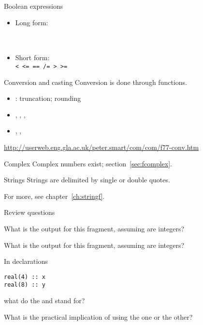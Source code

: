 \begin{block}{Boolean expressions}
  \label{sl:fbool}
  \begin{itemize}
  \item 
    Long form:\\
    \\
    \\
  \item Short form:\\
    \verb+< <= == /= > >=+
  \end{itemize}
\end{block}

\begin{block}{Conversion and casting}
  Conversion is done through functions.
  \begin{itemize}
  \item {}: truncation;  rounding
  \item {}, , , 
  \item {}, , 
  \end{itemize}
\url{http://userweb.eng.gla.ac.uk/peter.smart/com/com/f77-conv.htm}
\end{block}

\begin{block}{Complex}
  Complex numbers exist; section~\ref{sec:fcomplex}.
\end{block}

\begin{block}{Strings}
  Strings are delimited by single or double quotes.

  For more, see chapter~\ref{ch:stringf}.
\end{block}

 {Review questions}

\begin{exercise}
  What is the output for this fragment, assuming  are integers?
\end{exercise}

\begin{exercise}
  What is the output for this fragment, assuming  are integers?
\end{exercise}

\begin{exercise}
  \label{ex:f-elt-rev1}
  In declarations
\begin{lstlisting}
real(4) :: x
real(8) :: y
\end{lstlisting}
what do the  and  stand for?

What is the practical implication of using the one or the other?
\end{exercise}

